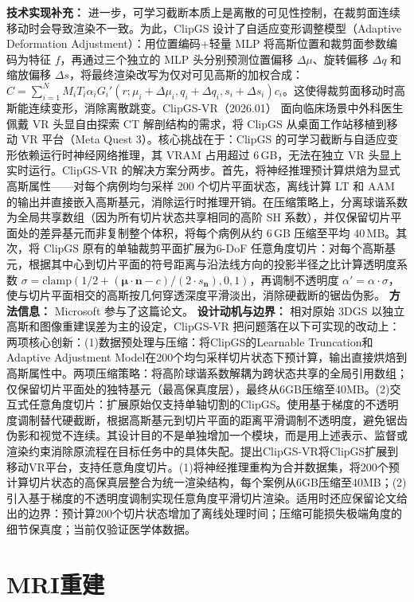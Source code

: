\textbf{技术实现补充：} 进一步，可学习截断本质上是离散的可见性控制，在裁剪面连续移动时会导致渲染不一致。为此，ClipGS 设计了自适应变形调整模型（Adaptive Deformation Adjustment）：用位置编码+轻量 MLP 将高斯位置和裁剪面参数编码为特征 $f$，再通过三个独立的 MLP 头分别预测位置偏移 $\Delta\mu$、旋转偏移 $\Delta q$ 和缩放偏移 $\Delta s$，将最终渲染改写为仅对可见高斯的加权合成：$C = \sum_{i=1}^{N} M_i T_i \alpha_i G_i'(r; \mu_i + \Delta\mu_i, q_i + \Delta q_i, s_i + \Delta s_i) c_i$。这使得裁剪面移动时高斯能连续变形，消除离散跳变。ClipGS-VR（2026.01） 面向临床场景中外科医生佩戴 VR 头显自由探索 CT 解剖结构的需求，将 ClipGS 从桌面工作站移植到移动 VR 平台（Meta Quest 3）。核心挑战在于：ClipGS 的可学习截断与自适应变形依赖运行时神经网络推理，其 VRAM 占用超过 6\,GB，无法在独立 VR 头显上实时运行。ClipGS-VR 的解决方案分两步。首先，将神经推理预计算烘焙为显式高斯属性——对每个病例均匀采样 200 个切片平面状态，离线计算 LT 和 AAM 的输出并直接嵌入高斯基元，消除运行时推理开销。在压缩策略上，分离球谐系数为全局共享数组（因为所有切片状态共享相同的高阶 SH 系数），并仅保留切片平面处的差异基元而非复制整个体积，将每个病例从约 6\,GB 压缩至平均 40\,MB。其次，将 ClipGS 原有的单轴裁剪平面扩展为6-DoF 任意角度切片：对每个高斯基元，根据其中心到切片平面的符号距离与沿法线方向的投影半径之比计算透明度系数 $\sigma = \mathrm{clamp}(1/2 + (\mathbf{\mu} \cdot \mathbf{n} - c)/(2 \cdot s_{\mathbf{n}}), 0, 1)$，再调制不透明度 $\alpha' = \alpha \cdot \sigma$，使与切片平面相交的高斯按几何穿透深度平滑淡出，消除硬截断的锯齿伪影。
\textbf{方法信息：} Microsoft 参与了这篇论文。
\textbf{设计动机与边界：} 相对原始 3DGS 以独立高斯和图像重建误差为主的设定，ClipGS-VR 把问题落在以下可实现的改动上：两项核心创新：(1)数据预处理与压缩：将ClipGS的Learnable Truncation和Adaptive Adjustment Model在200个均匀采样切片状态下预计算，输出直接烘焙到高斯属性中。两项压缩策略：将高阶球谐系数解耦为跨状态共享的全局引用数组；仅保留切片平面处的独特基元（最高保真度层），最终从6GB压缩至40MB。(2)交互式任意角度切片：扩展原始仅支持单轴切割的ClipGS。使用基于梯度的不透明度调制替代硬截断，根据高斯基元到切片平面的距离平滑调制不透明度，避免锯齿伪影和视觉不连续。其设计目的不是单独增加一个模块，而是用上述表示、监督或渲染约束消除原流程在目标任务中的具体失配。提出ClipGS-VR将ClipGS扩展到移动VR平台，支持任意角度切片。(1)将神经推理重构为合并数据集，将200个预计算切片状态的高保真层整合为统一渲染结构，每个案例从6GB压缩至40MB；(2)引入基于梯度的不透明度调制实现任意角度平滑切片渲染。适用时还应保留论文给出的边界：预计算200个切片状态增加了离线处理时间；压缩可能损失极端角度的细节保真度；当前仅验证医学体数据。

\section{MRI重建}

